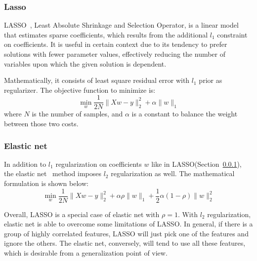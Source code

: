\subsubsection{Lasso}
\label{ssub:lasso}
LASSO~\cite{Tibshirani1996}, Least Absolute Shrinkage and Selection Operator, is a linear model that estimates sparse coefficients, which results from the additional $l_1$ constraint on coefficients.
It is useful in certain context due to its tendency to prefer solutions with fewer parameter values, effectively reducing the number of variables upon which the given solution is dependent.

Mathematically, it consists of least square residual error with $l_1$ prior as regularizer.
The objective function to minimize is:
\begin{equation}
  \min_w\frac{1}{2N}\|Xw - y\|^2_2 + \alpha\|w\|_1
\end{equation}
where $N$ is the number of samples, and $\alpha$ is a constant to balance the weight between those two costs.

\subsubsection{Elastic net}
\label{ssub:elastic_net}
In addition to $l_1$ regularization on coefficients $w$ like in LASSO(Section~\ref{ssub:lasso}), the elastic net~\cite{zou2005} method imposes $l_2$ regularization as well.
The mathematical formulation is shown below:
\begin{equation}
  \min_w\frac{1}{2N}\|Xw - y\|^2_2 + \alpha\rho\|w\|_1 + \frac{1}{2}\alpha(1-\rho)\|w\|^2_2
\end{equation}

Overall, LASSO is a special case of elastic net with $\rho = 1$.
With $l_2$ regularization, elastic net is able to overcome some limitations of LASSO\@.
In general, if there is a group of highly correlated features, LASSO will just pick one of the features and ignore the others.
The elastic net, conversely, will tend to use all these features, which is desirable from a generalization point of view.

